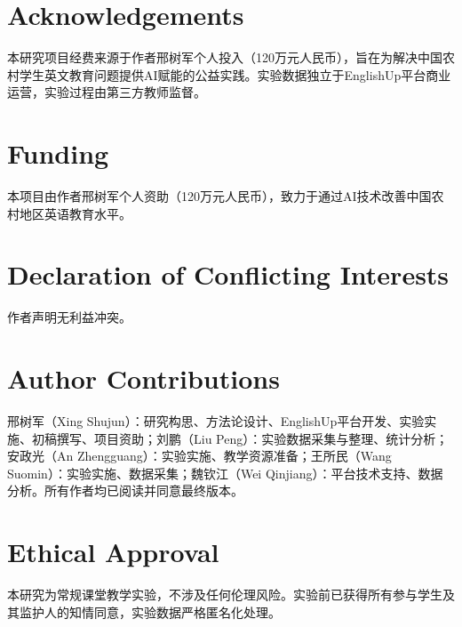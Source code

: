\documentclass[12pt,a4paper]{ctexart}
\newenvironment{acks}{\section*{Acknowledgements}}{}
\newenvironment{funding}{\section*{Funding}}{}
\newenvironment{dci}{\section*{Declaration of Conflicting Interests}}{}
\begin{document}
\begin{acks}
本研究项目经费来源于作者邢树军个人投入（120万元人民币），旨在为解决中国农村学生英文教育问题提供AI赋能的公益实践。实验数据独立于EnglishUp平台商业运营，实验过程由第三方教师监督。
\end{acks}

\begin{funding}
本项目由作者邢树军个人资助（120万元人民币），致力于通过AI技术改善中国农村地区英语教育水平。
\end{funding}

\begin{dci}
作者声明无利益冲突。
\end{dci}

\section*{Author Contributions}
邢树军（Xing Shujun）：研究构思、方法论设计、EnglishUp平台开发、实验实施、初稿撰写、项目资助；刘鹏（Liu Peng）：实验数据采集与整理、统计分析；安政光（An Zhengguang）：实验实施、教学资源准备；王所民（Wang Suomin）：实验实施、数据采集；魏钦江（Wei Qinjiang）：平台技术支持、数据分析。所有作者均已阅读并同意最终版本。

\section*{Ethical Approval}
本研究为常规课堂教学实验，不涉及任何伦理风险。实验前已获得所有参与学生及其监护人的知情同意，实验数据严格匿名化处理。
\end{document}

